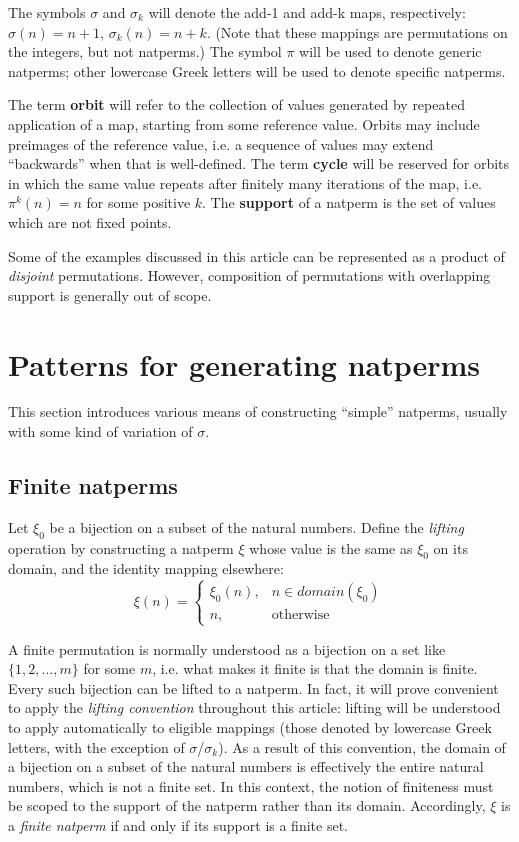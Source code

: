 \documentclass[12pt,reqno]{article}
\begin{document}
The symbols $\sigma$ and $\sigma_k$ will denote the add-1 and add-k maps, respectively: $\sigma(n) = n + 1$, $\sigma_k(n) = n + k$. (Note that these mappings are permutations on the integers, but not natperms.) The symbol $\pi$ will be used to denote generic natperms; other lowercase Greek letters will be used to denote specific natperms.

The term \textbf{orbit} will refer to the collection of values generated by repeated application of a map, starting from some reference value. Orbits may include preimages of the reference value, i.e. a sequence of values may extend ``backwards'' when that is well-defined. The term \textbf{cycle} will be reserved for orbits in which the same value repeats after finitely many iterations of the map, i.e. $\pi^k(n) = n$ for some positive $k$. The \textbf{support} of a natperm is the set of values which are not fixed points. 

Some of the examples discussed in this article can be represented as a product of \textit{disjoint} permutations. However, composition of permutations with overlapping support is generally out of scope.

\section{Patterns for generating natperms}

This section introduces various means of constructing ``simple'' natperms, usually with some kind of variation of $\sigma$.

\subsection{Finite natperms}

Let $\xi_0$ be a bijection on a subset of the natural numbers. Define the \textit{lifting} operation by constructing a natperm $\xi$ whose value is the same as $\xi_0$ on its domain, and the identity mapping elsewhere:
\begin{equation}
  \xi(n) = \begin{cases}
    \xi_0(n), & n \in domain(\xi_0) \\
    n, & \text{otherwise}
  \end{cases}
\end{equation}

A finite permutation is normally understood as a bijection on a set like $\{ 1, 2, \ldots, m \}$ for some $m$, i.e. what makes it finite is that the domain is finite. Every such bijection can be lifted to a natperm. In fact, it will prove convenient to apply the \textit{lifting convention} throughout this article: lifting will be understood to apply automatically to eligible mappings (those denoted by lowercase Greek letters, with the exception of $\sigma$/$\sigma_k$). As a result of this convention, the domain of a bijection on a subset of the natural numbers is effectively the entire natural numbers, which is not a finite set. In this context, the notion of finiteness must be scoped to the support of the natperm rather than its domain. Accordingly, $\xi$ is a \textit{finite natperm} if and only if its support is a finite set.
\end{document}

